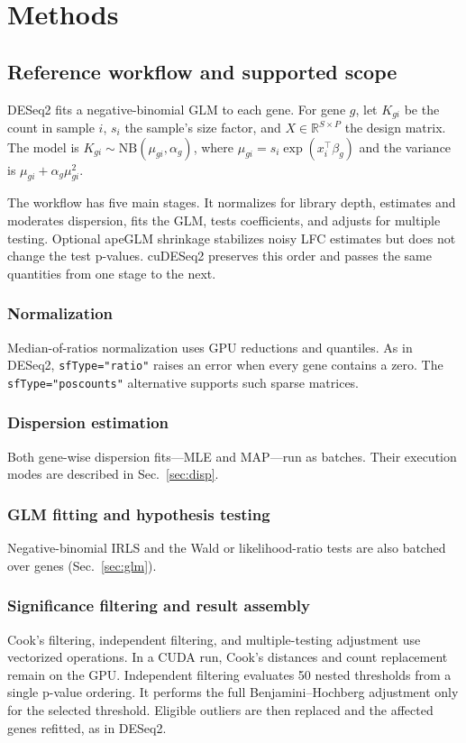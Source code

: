 \documentclass[12pt]{article}
\newcommand{\cudeseq}{cuDESeq2}
\begin{document}
\section{Methods}

\subsection{Reference workflow and supported scope}
\label{sec:pipeline}
DESeq2 \citep{love2014deseq2} fits a negative-binomial GLM to each gene. For
gene $g$, let $K_{gi}$ be the count in sample $i$, $s_i$ the sample's size
factor, and $X\in\mathbb{R}^{S\times P}$ the design matrix. The model is
$K_{gi}\sim\mathrm{NB}(\mu_{gi},\alpha_g)$, where
$\mu_{gi}=s_i\exp(x_i^{\!\top}\beta_g)$ and the variance is
$\mu_{gi}+\alpha_g\mu_{gi}^2$.

The workflow has five main stages. It normalizes for library depth, estimates
and moderates dispersion, fits the GLM, tests coefficients, and adjusts for
multiple testing. Optional apeGLM shrinkage stabilizes noisy LFC estimates but
does not change the test p-values. \cudeseq{} preserves this order and passes
the same quantities from one stage to the next.

\subsubsection{Normalization}
\label{sec:normalization}
Median-of-ratios normalization uses GPU reductions and quantiles. As in
DESeq2, \texttt{sfType="ratio"} raises an error when every gene contains a
zero. The \texttt{sfType="poscounts"} alternative supports such sparse
matrices.

\subsubsection{Dispersion estimation}
\label{sec:disp-overview}
Both gene-wise dispersion fits---MLE and MAP---run as batches. Their execution
modes are described in Sec.~\ref{sec:disp}.

\subsubsection{GLM fitting and hypothesis testing}
\label{sec:glm-overview}
Negative-binomial IRLS and the Wald or likelihood-ratio tests are also batched
over genes (Sec.~\ref{sec:glm}).

\subsubsection{Significance filtering and result assembly}
\label{sec:significance}
Cook's filtering, independent filtering, and multiple-testing adjustment use
vectorized operations. In a CUDA run, Cook's distances and count replacement
remain on the GPU. Independent filtering evaluates 50 nested thresholds from a
single p-value ordering. It performs the full Benjamini--Hochberg adjustment
only for the selected threshold. Eligible outliers are then replaced and the
affected genes refitted, as in DESeq2.
\end{document}
